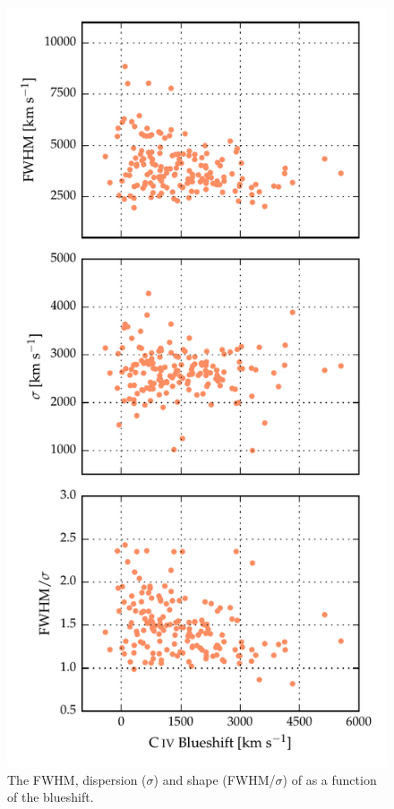 \begin{figure}
    \centering 
    \includegraphics[width=0.8\linewidth]{figures/chapter03/ha_comparisons_paper2.pdf} 
    \caption{The FWHM, dispersion ($\sigma$) and shape (FWHM/$\sigma$) of \ha as a function of the  blueshift.}
    \label{fig:line_comparison_ha}
\end{figure} 


